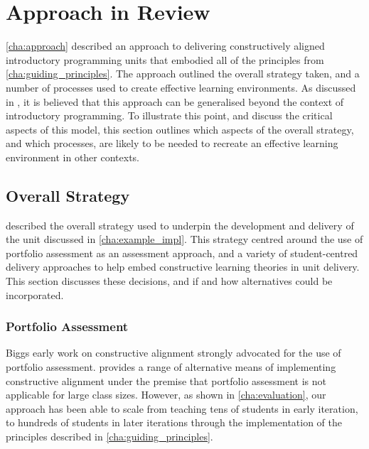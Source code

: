 


\section{Approach in Review} %
\label{sec:approach_in_review}

\cref{cha:approach} described an approach to delivering constructively aligned introductory programming units that embodied all of the principles from \cref{cha:guiding_principles}. The approach outlined the overall strategy taken, and a number of processes used to create effective learning environments. As discussed in , it is believed that this approach can be generalised beyond the context of introductory programming. To illustrate this point, and discuss the critical aspects of this model, this section outlines which aspects of the overall strategy, and which processes, are likely to be needed to recreate an effective learning environment in other contexts.

\subsection{Overall Strategy} %
\label{sub:overall_strategy}

 described the overall strategy used to underpin the development and delivery of the unit discussed in \cref{cha:example_impl}. This strategy centred around the use of portfolio assessment as an assessment approach, and a variety of  student-centred delivery approaches to help embed constructive learning theories in unit delivery. This section discusses these decisions, and if and how alternatives could be incorporated.

\subsubsection{Portfolio Assessment} %
 \label{ssub:portfolio_assessment}

Biggs early work on constructive alignment \cite{Biggs:1996c,Biggs:1999} strongly advocated for the use of portfolio assessment. \citet{Biggs:2007} provides a range of alternative means of implementing constructive alignment under the premise that portfolio assessment is not applicable for large class sizes. However, as shown in \cref{cha:evaluation}, our approach has been able to scale from teaching tens of students in early iteration, to hundreds of students in later iterations through the implementation of the principles described in \cref{cha:guiding_principles}.

